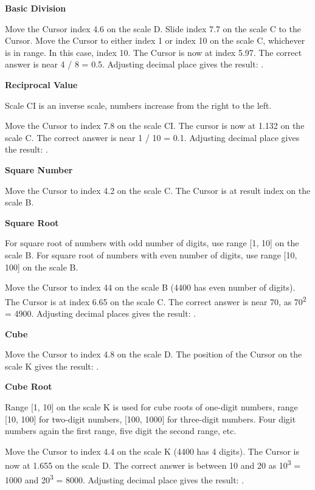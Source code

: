 \begin{multicols*}{3}
{  
  \textbf{Basic Division}

Move the Cursor index 4.6 on the scale D.
Slide index 7.7 on the scale C to the Cursor.
Move the Cursor to either index 1 or index 10 on the scale C, whichever is in range. In this case, index 10.
The Cursor is now at index 5.97. The correct answer is near 4 / 8 = 0.5. Adjusting decimal place gives the result: .

  \textbf{Reciprocal Value}

\footnotesize Scale CI is an inverse scale, numbers increase from the right to the left. \normalsize

Move the Cursor to index 7.8 on the scale CI.
The cursor is now at 1.132 on the scale C.
The correct answer is near 1 / 10 = 0.1. Adjusting decimal place gives the result: .

  \textbf{Square Number}

Move the Cursor to index 4.2 on the scale C.
The Cursor is at result index  on the scale B.

  \textbf{Square Root}

\footnotesize For square root of numbers with odd number of digits, use range [1, 10] on the scale B. For square root of numbers with even number of digits, use range [10, 100] on the scale B. \normalsize

Move the Cursor to index 44 on the scale B (4400 has even number of digits).
The Cursor is at index 6.65 on the scale C. The correct answer is near 70, as 70\textsuperscript{2} = 4900. Adjusting decimal places gives the result: .

  \textbf{Cube}

Move the Cursor to index 4.8 on the scale D.
The position of the Cursor on the scale K gives the result: .

  \textbf{Cube Root}

\footnotesize Range [1, 10] on the scale K is used for cube roots of one-digit numbers, range [10, 100] for two-digit numbers, [100, 1000] for three-digit numbers. Four digit numbers again the first range, five digit the second range, etc. \normalsize

Move the Cursor to index 4.4 on the scale K (4400 has 4 digits).
The Cursor is now at 1.655 on the scale D.
The correct answer is between 10 and 20 as 10\textsuperscript{3} = 1000 and 20\textsuperscript{3} = 8000. Adjusting decimal place gives the result: .

}
\end{multicols*}
